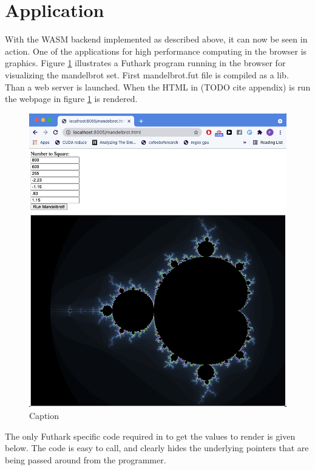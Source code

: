 \documentclass[11pt]{book}
\begin{document}
\section{Application}

With the WASM backend implemented as described above, it can now be seen in action. One of the applications for high performance computing in the browser is graphics. Figure \ref{fig:mandelbrot} illustrates a Futhark program running in the browser for visualizing the mandelbrot set. First mandelbrot.fut file is compiled as a lib. Than a web server is launched. When the HTML in (TODO cite appendix) is run the webpage in figure \ref{fig:mandelbrot} is rendered.



\begin{figure}[htbp]
    \centering
    \includegraphics[scale=0.3]{figures/mandelbrot.png}
    \caption{Caption}
    \label{fig:mandelbrot}
\end{figure}

The only Futhark specific code required in to get the values to render is given below. The code is easy to call, and clearly hides the underlying pointers that are being passed around from the programmer.
\end{document}
